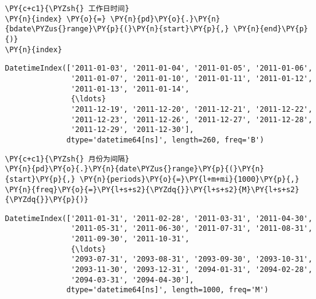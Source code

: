     \begin{tcolorbox}[breakable, size=fbox, boxrule=1pt, pad at break*=1mm,colback=cellbackground, colframe=cellborder]
\begin{Verbatim}[commandchars=\\\{\}]
\PY{c+c1}{\PYZsh{} 工作日时间}
\PY{n}{index} \PY{o}{=} \PY{n}{pd}\PY{o}{.}\PY{n}{bdate\PYZus{}range}\PY{p}{(}\PY{n}{start}\PY{p}{,} \PY{n}{end}\PY{p}{)}
\PY{n}{index}
\end{Verbatim}
\end{tcolorbox}

            \begin{tcolorbox}[breakable, size=fbox, boxrule=.5pt, pad at break*=1mm, opacityfill=0]
\begin{Verbatim}[commandchars=\\\{\}]
DatetimeIndex(['2011-01-03', '2011-01-04', '2011-01-05', '2011-01-06',
               '2011-01-07', '2011-01-10', '2011-01-11', '2011-01-12',
               '2011-01-13', '2011-01-14',
               {\ldots}
               '2011-12-19', '2011-12-20', '2011-12-21', '2011-12-22',
               '2011-12-23', '2011-12-26', '2011-12-27', '2011-12-28',
               '2011-12-29', '2011-12-30'],
              dtype='datetime64[ns]', length=260, freq='B')
\end{Verbatim}
\end{tcolorbox}
        
    \begin{tcolorbox}[breakable, size=fbox, boxrule=1pt, pad at break*=1mm,colback=cellbackground, colframe=cellborder]
\begin{Verbatim}[commandchars=\\\{\}]
\PY{c+c1}{\PYZsh{} 月份为间隔}
\PY{n}{pd}\PY{o}{.}\PY{n}{date\PYZus{}range}\PY{p}{(}\PY{n}{start}\PY{p}{,} \PY{n}{periods}\PY{o}{=}\PY{l+m+mi}{1000}\PY{p}{,} \PY{n}{freq}\PY{o}{=}\PY{l+s+s2}{\PYZdq{}}\PY{l+s+s2}{M}\PY{l+s+s2}{\PYZdq{}}\PY{p}{)}
\end{Verbatim}
\end{tcolorbox}

            \begin{tcolorbox}[breakable, size=fbox, boxrule=.5pt, pad at break*=1mm, opacityfill=0]
\begin{Verbatim}[commandchars=\\\{\}]
DatetimeIndex(['2011-01-31', '2011-02-28', '2011-03-31', '2011-04-30',
               '2011-05-31', '2011-06-30', '2011-07-31', '2011-08-31',
               '2011-09-30', '2011-10-31',
               {\ldots}
               '2093-07-31', '2093-08-31', '2093-09-30', '2093-10-31',
               '2093-11-30', '2093-12-31', '2094-01-31', '2094-02-28',
               '2094-03-31', '2094-04-30'],
              dtype='datetime64[ns]', length=1000, freq='M')
\end{Verbatim}
\end{tcolorbox}
        
